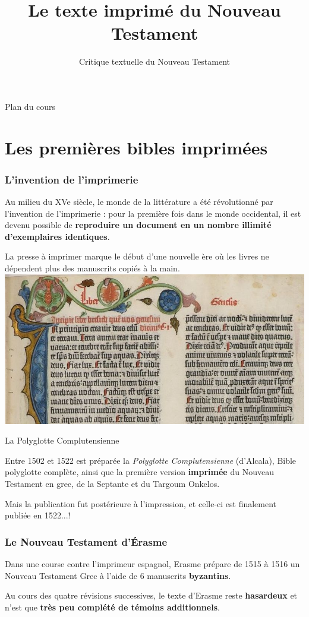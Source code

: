 \documentclass[11pt]{beamer}
\begin{document}
\title{Le texte imprimé du Nouveau Testament}
\subtitle{Critique textuelle du Nouveau Testament}

\begin{frame}{}
    \titlepage
\end{frame}

\begin{frame}{Plan du cours}
\tableofcontents
\end{frame}

\section{Les premières bibles imprimées}

\begin{frame}
  \frametitle{L'invention de l'imprimerie}
  \begin{alertblock}{}
      Au milieu du XVe siècle, le monde de la littérature a été révolutionné par l'invention de l'imprimerie : pour la première fois dans le monde occidental, il est devenu possible de \textbf{reproduire un document en un nombre illimité d'exemplaires identiques}.
  \end{alertblock}
  La presse à imprimer marque le début d'une nouvelle ère où les livres ne dépendent plus des manuscrits copiés à la main.
\centering
\includegraphics[width=0.5\linewidth]{img/incipit_genese_image_en_une.jpg}
\end{frame}



\begin{frame}{La Polyglotte Complutensienne}
    \begin{alertblock}{}
        Entre 1502 et 1522 est préparée la \textit{Polyglotte Complutensienne} (d'Alcala), 
        Bible polyglotte complète, ainsi que la première version \textbf{imprimée} du Nouveau Testament en grec, de la Septante et du Targoum Onkelos.
    \end{alertblock}
    Mais la publication fut postérieure à l'impression, et celle-ci est finalement publiée en 1522...!
\end{frame}


\begin{frame}
  \frametitle{Le Nouveau Testament d'Érasme}
  \begin{alertblock}{}
      Dans une course contre l'imprimeur espagnol, Erasme prépare de 1515 à 1516 un Nouveau Testament Grec à l'aide de 6 manuscrits \textbf{byzantins}.
  \end{alertblock}

  Au cours des quatre révisions successives, le texte d'Erasme reste \textbf{hasardeux} et n'est que \textbf{très peu complété de témoins additionnels}.
\end{frame}
\end{document}
